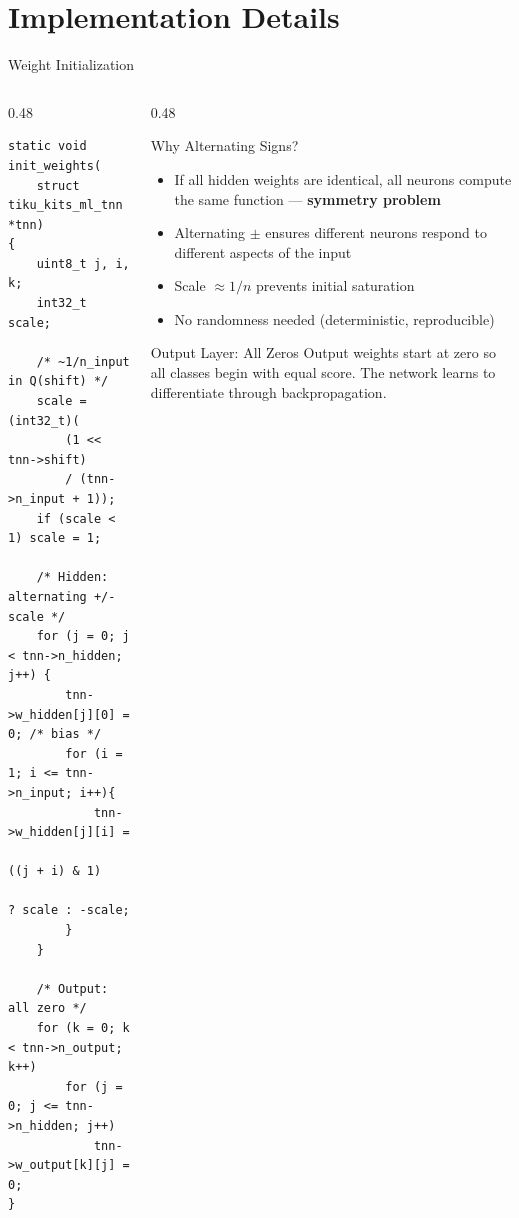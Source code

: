 \documentclass[aspectratio=169, 10pt]{beamer}
\begin{document}
\section{Implementation Details}

\begin{frame}[fragile]{Weight Initialization}
\begin{columns}[T]
\begin{column}{0.48\textwidth}
\begin{lstlisting}[style=cstyle,
  title={Symmetry-breaking initialization}]
static void init_weights(
    struct tiku_kits_ml_tnn *tnn)
{
    uint8_t j, i, k;
    int32_t scale;

    /* ~1/n_input in Q(shift) */
    scale = (int32_t)(
        (1 << tnn->shift)
        / (tnn->n_input + 1));
    if (scale < 1) scale = 1;

    /* Hidden: alternating +/- scale */
    for (j = 0; j < tnn->n_hidden; j++) {
        tnn->w_hidden[j][0] = 0; /* bias */
        for (i = 1; i <= tnn->n_input; i++){
            tnn->w_hidden[j][i] =
                ((j + i) & 1)
                    ? scale : -scale;
        }
    }

    /* Output: all zero */
    for (k = 0; k < tnn->n_output; k++)
        for (j = 0; j <= tnn->n_hidden; j++)
            tnn->w_output[k][j] = 0;
}
\end{lstlisting}
\end{column}

\begin{column}{0.48\textwidth}
\begin{block}{Why Alternating Signs?}
\begin{itemize}
  \item If all hidden weights are identical, all neurons
    compute the same function --- \textbf{symmetry problem}
  \item Alternating $\pm$ ensures different neurons
    respond to different aspects of the input
  \item Scale $\approx 1/n$ prevents initial saturation
  \item No randomness needed (deterministic, reproducible)
\end{itemize}
\end{block}

\vspace{0.3em}
\begin{block}{Output Layer: All Zeros}
Output weights start at zero so all classes begin
with equal score. The network learns to differentiate
through backpropagation.
\end{block}
\end{column}
\end{columns}
\end{frame}
\end{document}
